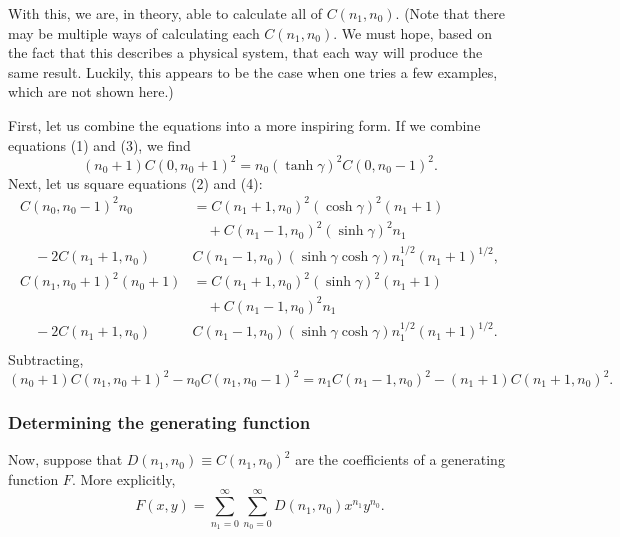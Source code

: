 \documentclass[12pt]{article}
\begin{document}
With this, we are, in theory, able to calculate all of $C(n_1,n_0).$  (Note that there may be multiple ways of calculating each $C(n_1,n_0).$  We must hope, based on the fact that this describes a physical system, that each way will produce the same result.  Luckily, this appears to be the case when one tries a few examples, which are not shown here.)

First, let us combine the equations into a more inspiring form.  If we combine equations (1) and (3), we find
\begin{equation}
	(n_0+1)C(0,n_0+1)^{2} = n_0(\tanh \gamma)^{2}C(0,n_0-1)^{2}.
\end{equation}
Next, let us square equations (2) and (4): 
\begin{align*}
	C(n_0,n_0-1)^{2}n_0 &= C(n_1+1,n_0)^{2}(\cosh \gamma)^{2}(n_1+1) \\
			    & \quad + C(n_1-1,n_0)^{2}(\sinh \gamma)^{2}n_1 \\
	\quad - 2C(n_1+1,n_0) & C(n_1-1,n_0)(\sinh \gamma \cosh \gamma)n_1^{1/2}(n_1+1)^{1/2}, \\
	C(n_1,n_0+1)^{2}(n_0+1) &= C(n_1+1,n_0)^{2}(\sinh \gamma)^{2}(n_1+1) \\
				& \quad +C(n_1-1,n_0)^{2}n_1 \\
	\quad - 2C(n_1+1,n_0) & C(n_1-1,n_0)(\sinh \gamma \cosh \gamma)n_1^{1/2}(n_1+1)^{1/2}. \\
\end{align*}
Subtracting, 
\begin{equation}
	(n_0+1)C(n_1,n_0+1)^{2}-n_0C(n_1,n_0-1)^{2} = n_1 C(n_1-1,n_0)^{2} - (n_1+1)C(n_1+1,n_0)^{2}.
\end{equation}

\subsubsection*{Determining the generating function}
Now, suppose that $D(n_1,n_0) \equiv C(n_1,n_0)^2$ are the coefficients of a generating function $F.$ More explicitly, 
\[
	F(x,y) = \sum_{n_1=0}^{\infty} \sum_{n_0=0}^{\infty} D(n_1,n_0) x^{n_1} y^{n_0}.
\] 
\end{document}
